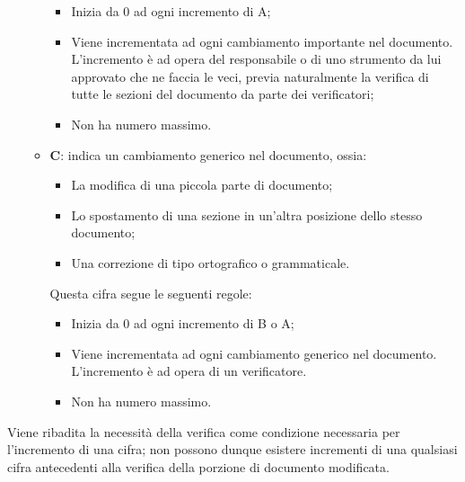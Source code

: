 \documentclass[../norme-di-progetto.tex]{subfiles}
\begin{document}
\begin{itemize}
\begin{itemize}
    \begin{itemize}
      \item Inizia da 0 ad ogni incremento di A;
      \item Viene incrementata ad ogni cambiamento importante nel documento. L'incremento è ad opera del responsabile o di uno strumento da lui approvato che ne faccia le veci, previa naturalmente la verifica di tutte le sezioni del documento da parte dei verificatori;
      \item Non ha numero massimo.
    \end{itemize}
    \item \textbf{C}: indica un cambiamento generico nel documento, ossia:
    \begin{itemize}
      \item La modifica di una piccola parte di documento;
      \item Lo spostamento di una sezione in un'altra posizione dello stesso documento;
      \item Una correzione di tipo ortografico o grammaticale.
    \end{itemize}
    Questa cifra segue le seguenti regole:
    \begin{itemize}
      \item Inizia da 0 ad ogni incremento di B o A;
      \item Viene incrementata ad ogni cambiamento generico nel documento. L'incremento è ad opera di un verificatore.
      \item Non ha numero massimo.
    \end{itemize}
  \end{itemize}
\end{itemize}
Viene ribadita la necessità della verifica come condizione necessaria per l'incremento di una cifra; non possono dunque esistere incrementi di una qualsiasi cifra antecedenti alla verifica della porzione di documento modificata.
\end{document}
